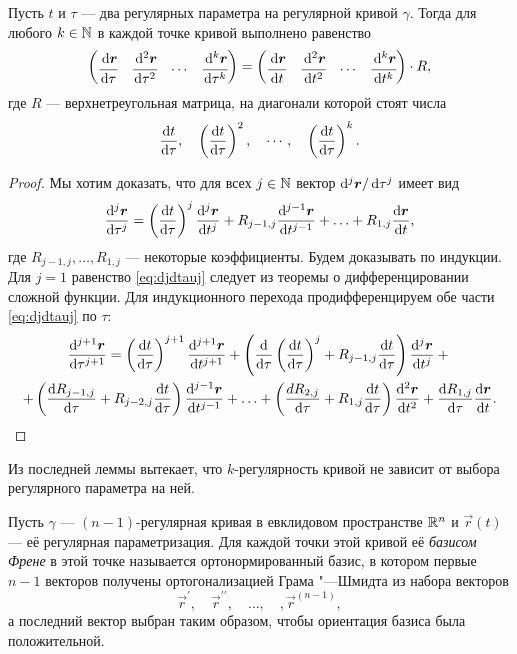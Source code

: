 \begin{lemma} \label{lemma:UpperTriangleLemma}
	Пусть $t$ и $\tau$ --- два регулярных параметра на регулярной кривой $\gamma$. Тогда для любого $k \in \mathbb{N}$ в каждой точке кривой выполнено равенство
	\[
		\begin{pmatrix}
			\cfrac{\d\vec{r}}{\d\tau} & \cfrac{\d^2\vec{r}}{\d\tau^2} & \cdots & \cfrac{\d^k\vec{r}}{\d\tau^k}
		\end{pmatrix} =
		\begin{pmatrix}
			\cfrac{\d\vec{r}}{\d t} & \cfrac{\d^2\vec{r}}{\d t^2} & \cdots & \cfrac{\d^k\vec{r}}{\d t^k}
		\end{pmatrix} \cdot R,
	\]
	где $R$ --- верхнетреугольная матрица, на диагонали которой стоят числа
	\[
		\frac{\mathop{}\!\mathrm{d} t}{\mathop{}\!\mathrm{d}\tau},\quad\left(\frac{\mathop{}\!\mathrm{d} t}{\mathop{}\!\mathrm{d}\tau}\right)^2,\quad\cdots,\quad\left(\frac{\mathop{}\!\mathrm{d} t}{\mathop{}\!\mathrm{d}\tau}\right)^k.
	\]
\end{lemma}

\begin{proof}
	Мы хотим доказать, что для всех $j \in \mathbb{N}$ вектор $\mathop{}\!\mathrm{d}^j\boldsymbol{r} / \mathop{}\!\mathrm{d}\tau^j$ имеет вид
	\begin{equation} \label{eq:djdtauj}
		\frac{\d^j\vec{r}}{\d\tau^j} = \br{\frac{\d t}{\d\tau}}^j\frac{\d^j\vec{r}}{\d t^j} + R_{j - 1, j}\frac{\d^{j - 1}\vec{r}}{\d t^{j - 1}} + \ldots + R_{1, j}\frac{\d\vec{r}}{\d t},
	\end{equation}
	где $R_{j - 1, j}, \ldots, R_{1, j}$ --- некоторые коэффициенты. Будем доказывать по индукции. Для $j = 1$ равенство \eqref{eq:djdtauj} следует из теоремы о дифференцировании сложной функции. Для индукционного перехода продифференцируем обе части \eqref{eq:djdtauj} по $\tau$:
	\begin{multline*}
		\frac{\d^{j + 1}\vec{r}}{\d\tau^{j + 1}} = \br{\frac{\d t}{\d\tau}}^{j + 1}\frac{\d^{j + 1}\vec{r}}{{\d t^{j + 1}}} + \br{\frac{\d}{\d\tau}\br{\frac{\d t}{\d\tau}}^j + R_{j - 1, j}\frac{\d t}{\d\tau}}\frac{\d^j\vec{r}}{\d t^j} + {}\\ + \br{\frac{\d R_{j - 1, j}}{\d\tau} + R_{j - 2, j}\frac{\d t}{\d\tau}}\frac{\d^{j - 1}\vec{r}}{\d t^{j - 1}} + \ldots + \br{\frac{dR_{2, j}}{\d\tau} + R_{1, j}\frac{\d t}{\d\tau}}\frac{\d^2\vec{r}}{\d t^2} + \frac{\d R_{1, j}}{\d\tau}\frac{\d\vec{r}}{\d t}.
	\end{multline*}
\end{proof}

Из последней леммы вытекает, что $k$-регулярность кривой не зависит от выбора регулярного параметра на ней.

\begin{definition}
	Пусть $\gamma$ --- $(n - 1)$-регулярная кривая в евклидовом пространстве $\mathbb{R}^n$ и $\vec{r}(t)$ --- её регулярная параметризация. Для каждой точки этой кривой её \textit{базисом Френе} в этой точке называется ортонормированный базис, в котором первые $n - 1$ векторов получены ортогонализацией Грама "---Шмидта из набора векторов
	\[
		\vec{r}^\prime,\quad \vec{r}^{\prime\prime},\quad \ldots, \quad, \vec{r}^{(n - 1)},
	\]
	а последний вектор выбран таким образом, чтобы ориентация базиса была положительной.
\end{definition}

